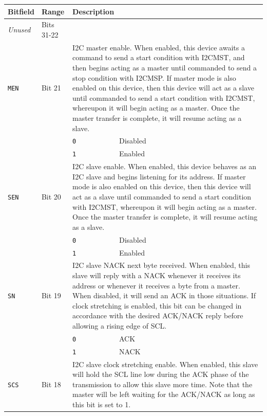 \begin{tabularx}{\textwidth}{ l l l X }
\textbf{Bitfield} & \textbf{Range} & \multicolumn{2}{X}{\textbf{Description}} \\ \hline
\textit{Unused} & Bits 31-22 & \multicolumn{2}{X}{} \\
\hline
\texttt{MEN} & Bit 21 & \multicolumn{2}{X}{I2C master enable. When enabled, this device awaits a command to send a start condition with I2CMST, and then begins acting as a master until commanded to send a stop condition with I2CMSP. If master mode is also enabled on this device, then this device will act as a slave until commanded to send a start condition with I2CMST, whereupon it will begin acting as a master. Once the master transfer is complete, it will resume acting as a slave.} \\
 & & \texttt{0} & Disabled \\
 & & \cellcolor{tablehighlightcolor}\texttt{1} & \cellcolor{tablehighlightcolor}Enabled \\
\hline
\texttt{SEN} & Bit 20 & \multicolumn{2}{X}{I2C slave enable. When enabled, this device behaves as an I2C slave and begins listening for its address. If master mode is also enabled on this device, then this device will act as a slave until commanded to send a start condition with I2CMST, whereupon it will begin acting as a master. Once the master transfer is complete, it will resume acting as a slave.} \\
 & & \texttt{0} & Disabled \\
 & & \cellcolor{tablehighlightcolor}\texttt{1} & \cellcolor{tablehighlightcolor}Enabled \\
\hline
\texttt{SN} & Bit 19 & \multicolumn{2}{X}{I2C slave NACK next byte received. When enabled, this slave will reply with a NACK whenever it receives its address or whenever it receives a byte from a master. When disabled, it will send an ACK in those situations. If clock stretching is enabled, this bit can be changed in accordance with the desired ACK/NACK reply before allowing a rising edge of SCL.} \\
 & & \texttt{0} & ACK \\
 & & \cellcolor{tablehighlightcolor}\texttt{1} & \cellcolor{tablehighlightcolor}NACK \\
\hline
\texttt{SCS} & Bit 18 & \multicolumn{2}{X}{I2C slave clock stretching enable. When enabled, this slave will hold the SCL line low during the ACK phase of the transmission to allow this slave more time. Note that the master will be left waiting for the ACK/NACK as long as this bit is set to 1.} \\

\end{tabularx}
